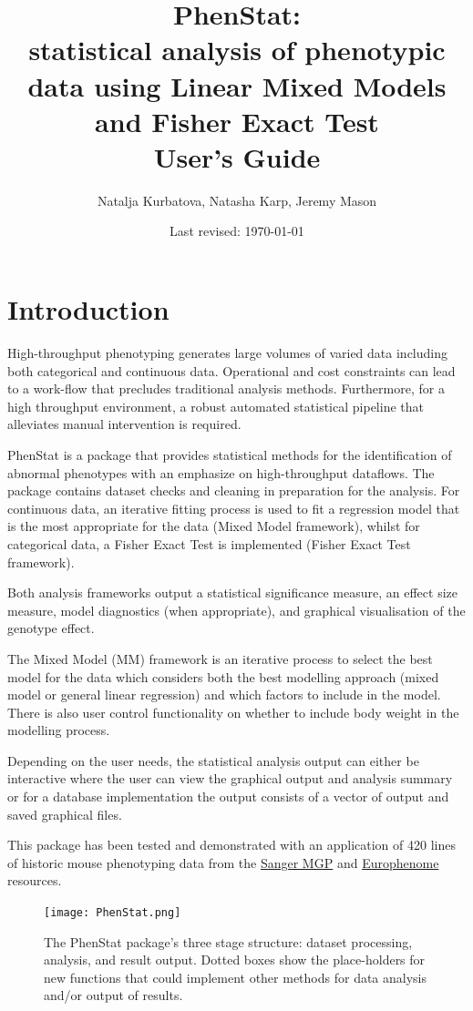 \documentclass[12pt,a4paper]{article}
\title{\textbf{PhenStat}: \\ statistical analysis of phenotypic data using Linear Mixed Models and Fisher Exact Test\\ \textbf{User's Guide}}
\author{Natalja Kurbatova, Natasha Karp, Jeremy Mason}
\date{Last revised: \today}
\begin{document}
\maketitle
\newpage
\tableofcontents
\newpage
\section{Introduction}
High-throughput phenotyping generates large volumes of varied data including both categorical and continuous data. Operational and cost constraints can lead to a work-flow that precludes traditional analysis methods. Furthermore, for a high throughput environment, a robust automated statistical pipeline that alleviates manual intervention is required. 

PhenStat is a package that provides statistical methods for the identification of abnormal phenotypes with an emphasize on high-throughput dataflows. The package contains dataset checks and cleaning in preparation for the analysis. For continuous data, an iterative fitting process is used to fit a regression model that is the most appropriate for the data (Mixed Model framework), whilst for categorical data, a Fisher Exact Test is implemented (Fisher Exact Test framework). 

Both analysis frameworks output a statistical significance measure, an effect size measure, model diagnostics (when appropriate), and graphical visualisation of the genotype effect. 

The Mixed Model (MM) framework is an iterative process to select the best model for the data which considers both the best modelling approach (mixed model or general linear regression) and which factors to include in the model. There is also user control functionality on whether to include body weight in the modelling process. 

Depending on the user needs, the statistical analysis output can either be interactive where the user can view the graphical output and analysis summary or for a database implementation the output consists of a vector of output and saved graphical files. 

This package has been tested and demonstrated with an application of 420 lines of historic mouse phenotyping data from the  \href{http://www.sanger.ac.uk/mouseportal/}{Sanger MGP} and \href{http://www.europhenome.org/}{Europhenome} resources. 
\\

\begin{figure}[!htpb]%
\centerline{\texttt{[image: PhenStat.png]}}
\caption{The PhenStat package's three stage structure: dataset processing, analysis, and result output. Dotted boxes show the place-holders for new functions that could implement other methods for data analysis and/or output of results.}\label{fig:01}
\end{figure}
\end{document}
